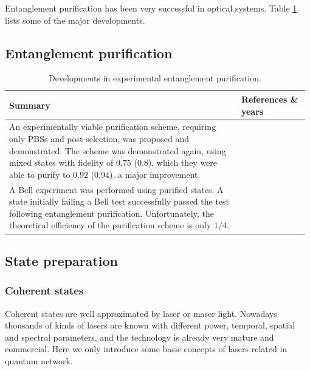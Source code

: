 \documentclass[aps, rmp, twocolumn, amsmath, amssymb, nofootinbib, superscriptaddress, longbibliography, floatfix, table-of-contents, eqsecnum]{revtex4-1}
\begin{document}
%
%

Entanglement purification has been very successful in optical systems. Table \ref{tab:ent_pur} lists some of the major developments.

\subsection{Entanglement purification} 

\begin{table}[!htb]
\caption{Developments in experimental entanglement purification.} \label{tab:ent_pur}
\begin{tabular}{|p{0.755\linewidth}|p{0.22\linewidth}|}
	\hline
	Summary & References \& years \\
	\hline \hline
	An experimentally viable purification scheme, requiring only PBSs and post-selection, was proposed and demonstrated. The scheme was demonstrated again, using mixed states with fidelity of $0.75$ ($0.8$), which they were able to purify to $0.92$ ($0.94$), a major improvement. & \cite{bib:Nature_410_1067, bib:Nature_423_417} \\
	\hline
	A Bell experiment was performed using purified states. A state initially failing a Bell test successfully passed the test following entanglement purification. Unfortunately, the theoretical efficiency of the purification scheme is only $1/4$. & \cite{bib:PRL_94_040504, bib:Nature_410_1067} \\
	\hline
\end{tabular}
\end{table}

%
%

\subsection{State preparation} 

%
%

\subsubsection{Coherent states} 

Coherent states are well approximated by laser or maser light. Nowadays thousands of kinds of lasers are known with different power, temporal, spatial and spectral parameters, and the technology is already very mature and commercial. Here we only introduce some basic concepts of lasers related in quantum network.
\end{document}
